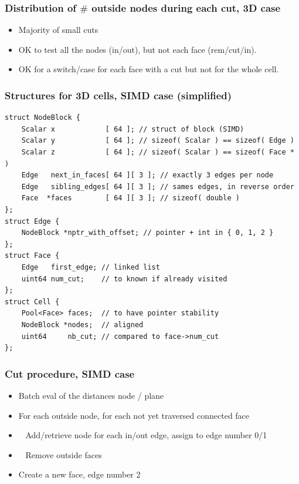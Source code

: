 \documentclass[aspectratio=169]{beamer}
\begin{document}
\begin{frame}
    \frametitle{Distribution of $\#$ outside nodes during each cut, 3D case}

    \begin{minipage}[c][0.6\textheight][c]{0.4\textwidth}
        
    \end{minipage}
    \textwidth
    \begin{minipage}{0.55\textwidth}
        \begin{itemize}
            \item Majority of small cuts

            \bigskip
            \item OK to test all the nodes (in/out), but not each face (rem/cut/in).

            \bigskip
            \item OK for a switch/case for each face with a cut but not for the whole cell.
        \end{itemize}
    \end{minipage}
\end{frame}

\begin{frame}[fragile]
    \frametitle{Structures for 3D cells, SIMD case (simplified)}

    \begin{footnotesize}
    \begin{lstlisting} 
struct NodeBlock {
    Scalar x            [ 64 ]; // struct of block (SIMD)
    Scalar y            [ 64 ]; // sizeof( Scalar ) == sizeof( Edge )
    Scalar z            [ 64 ]; // sizeof( Scalar ) == sizeof( Face * )
    Edge   next_in_faces[ 64 ][ 3 ]; // exactly 3 edges per node 
    Edge   sibling_edges[ 64 ][ 3 ]; // sames edges, in reverse order
    Face  *faces        [ 64 ][ 3 ]; // sizeof( double )
};
struct Edge {
    NodeBlock *nptr_with_offset; // pointer + int in { 0, 1, 2 }
};
struct Face {
    Edge   first_edge; // linked list
    uint64 num_cut;    // to known if already visited
};
struct Cell {
    Pool<Face> faces;  // to have pointer stability
    NodeBlock *nodes;  // aligned
    uint64     nb_cut; // compared to face->num_cut
};
    \end{lstlisting}
    \end{footnotesize}
\end{frame}

\begin{frame}
    \frametitle{Cut procedure, SIMD case}

    \begin{itemize}
        \item Batch eval of the distances node / plane
        \item For each outside node, for each not yet traversed connected face
        \item \ \kern 2mm Add/retrieve node for each in/out edge, assign to edge number 0/1
        \item \ \kern 2mm Remove outside faces
        \item Create a new face, edge number 2
    \end{itemize}
\end{frame}
\end{document}
